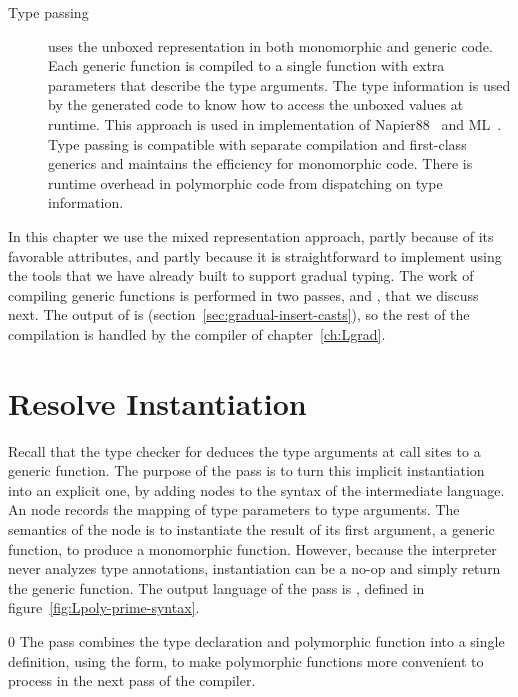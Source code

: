 \documentclass[7x10]{TimesAPriori_MIT}%
\def\racketEd{0}
\def\edition{0}
\numberwithin{theorem}{chapter}
\numberwithin{definition}{chapter}
\numberwithin{equation}{chapter}
\begin{document}
\begin{description}
\item[Type passing] uses the unboxed representation in both
  monomorphic and generic code. Each generic function is compiled to a
  single function with extra parameters that describe the type
  arguments. The type information is used by the generated code to
  know how to access the unboxed values at runtime. This approach is
  used in implementation of Napier88~\citep{Morrison:1991aa} and
  ML~\citep{Harper:1995um}.  Type passing is compatible with separate
  compilation and first-class generics and maintains the
  efficiency for monomorphic code. There is runtime overhead in
  polymorphic code from dispatching on type information.
\end{description}

In this chapter we use the mixed representation approach, partly
because of its favorable attributes, and partly because it is
straightforward to implement using the tools that we have already
built to support gradual typing. The work of compiling generic
functions is performed in two passes,  and
, that we discuss next. The output of
 is \LangCast{}
(section~\ref{sec:gradual-insert-casts}), so the rest of the
compilation is handled by the compiler of chapter~\ref{ch:Lgrad}.

\section{Resolve Instantiation}
\label{sec:generic-resolve}

Recall that the type checker for \LangPoly{} deduces the type
arguments at call sites to a generic function. The purpose of the
 pass is to turn this implicit instantiation into an
explicit one, by adding  nodes to the syntax of the
intermediate language.  An  node records the mapping of
type parameters to type arguments. The semantics of the 
node is to instantiate the result of its first argument, a generic
function, to produce a monomorphic function. However, because the
interpreter never analyzes type annotations, instantiation can be a
no-op and simply return the generic function.
%
The output language of the  pass is \LangInst{}, defined
in figure~\ref{fig:Lpoly-prime-syntax}.

\if\edition\racketEd    
The  pass combines the type declaration and polymorphic
function into a single definition, using the  form, to make
polymorphic functions more convenient to process in the next pass of the
compiler.
\fi
\end{document}

